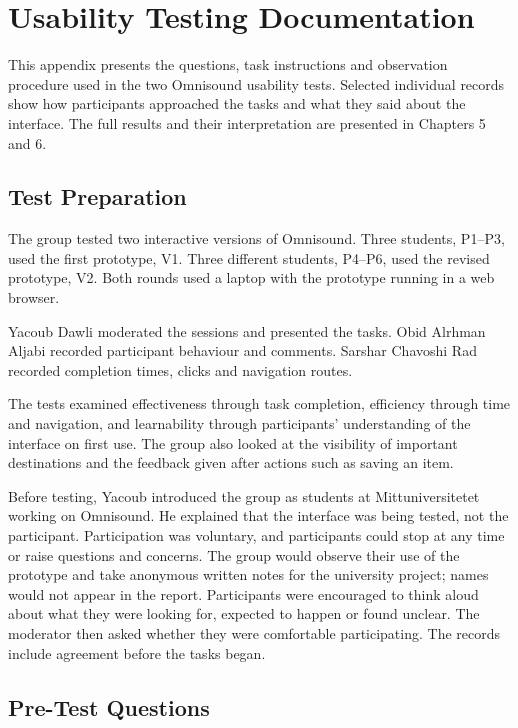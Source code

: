 \chapter{Usability Testing Documentation}
\label{app:usability-testing}

This appendix presents the questions, task instructions and observation procedure used in the two Omnisound usability tests. Selected individual records show how participants approached the tasks and what they said about the interface. The full results and their interpretation are presented in Chapters 5 and 6.

\section{Test Preparation}

The group tested two interactive versions of Omnisound. Three students, P1--P3, used the first prototype, V1. Three different students, P4--P6, used the revised prototype, V2. Both rounds used a laptop with the prototype running in a web browser.

Yacoub Dawli moderated the sessions and presented the tasks. Obid Alrhman Aljabi recorded participant behaviour and comments. Sarshar Chavoshi Rad recorded completion times, clicks and navigation routes.

The tests examined effectiveness through task completion, efficiency through time and navigation, and learnability through participants' understanding of the interface on first use. The group also looked at the visibility of important destinations and the feedback given after actions such as saving an item.

Before testing, Yacoub introduced the group as students at Mittuniversitetet working on Omnisound. He explained that the interface was being tested, not the participant. Participation was voluntary, and participants could stop at any time or raise questions and concerns. The group would observe their use of the prototype and take anonymous written notes for the university project; names would not appear in the report. Participants were encouraged to think aloud about what they were looking for, expected to happen or found unclear. The moderator then asked whether they were comfortable participating. The records include agreement before the tasks began.

\section{Pre-Test Questions}

